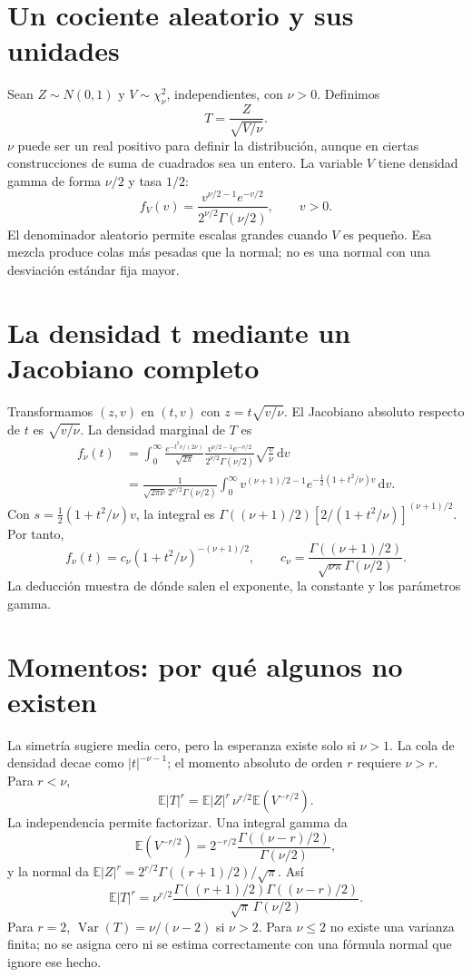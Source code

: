 \documentclass[11pt,a4paper]{article}
\newcommand{\E}{\mathbb E}
\newcommand{\dd}{\,\mathrm d}
\DeclareMathOperator{\Var}{Var}
\theoremstyle{definition}
\begin{document}
\section{Un cociente aleatorio y sus unidades}
Sean $Z\sim N(0,1)$ y $V\sim\chi_\nu^2$, independientes, con $\nu>0$.
Definimos
\[
T=\frac{Z}{\sqrt{V/\nu}}.
\]
$\nu$ puede ser un real positivo para definir la distribución, aunque en ciertas construcciones de suma de cuadrados sea un entero.
La variable $V$ tiene densidad gamma de forma $\nu/2$ y tasa $1/2$:
\[
f_V(v)=\frac{v^{\nu/2-1}e^{-v/2}}{2^{\nu/2}\Gamma(\nu/2)},\qquad v>0.
\]
El denominador aleatorio permite escalas grandes cuando $V$ es pequeño.
Esa mezcla produce colas más pesadas que la normal; no es una normal con una desviación estándar fija mayor.

\section{La densidad t mediante un Jacobiano completo}
Transformamos $(z,v)$ en $(t,v)$ con $z=t\sqrt{v/\nu}$.
El Jacobiano absoluto respecto de $t$ es $\sqrt{v/\nu}$.
La densidad marginal de $T$ es
\[
\begin{aligned}
f_\nu(t)
&=\int_0^\infty
\frac{e^{-t^2v/(2\nu)}}{\sqrt{2\pi}}
\frac{v^{\nu/2-1}e^{-v/2}}{2^{\nu/2}\Gamma(\nu/2)}
\sqrt{\frac v\nu}\dd v\\
&=\frac1{\sqrt{2\pi\nu}\,2^{\nu/2}\Gamma(\nu/2)}
\int_0^\infty v^{(\nu+1)/2-1}
e^{-\frac12(1+t^2/\nu)v}\dd v.
\end{aligned}
\]
Con $s=\tfrac12(1+t^2/\nu)v$, la integral es
$\Gamma((\nu+1)/2)[2/(1+t^2/\nu)]^{(\nu+1)/2}$.
Por tanto,
\[
f_\nu(t)=c_\nu(1+t^2/\nu)^{-(\nu+1)/2},\qquad
c_\nu=\frac{\Gamma((\nu+1)/2)}{\sqrt{\nu\pi}\Gamma(\nu/2)}.
\]
La deducción muestra de dónde salen el exponente, la constante y los parámetros gamma.

\section{Momentos: por qué algunos no existen}
La simetría sugiere media cero, pero la esperanza existe solo si $\nu>1$.
La cola de densidad decae como $|t|^{-\nu-1}$; el momento absoluto de orden $r$ requiere $\nu>r$.
Para $r<\nu$,
\[
\E|T|^r=\E|Z|^r\,\nu^{r/2}\E(V^{-r/2}).
\]
La independencia permite factorizar.
Una integral gamma da
\[
\E(V^{-r/2})=2^{-r/2}
\frac{\Gamma((\nu-r)/2)}{\Gamma(\nu/2)},
\]
y la normal da
$\E|Z|^r=2^{r/2}\Gamma((r+1)/2)/\sqrt\pi$.
Así
\[
\E|T|^r=
\nu^{r/2}\frac{\Gamma((r+1)/2)\Gamma((\nu-r)/2)}
{\sqrt\pi\,\Gamma(\nu/2)}.
\]
Para $r=2$, $\Var(T)=\nu/(\nu-2)$ si $\nu>2$.
Para $\nu\le2$ no existe una varianza finita; no se asigna cero ni se estima correctamente con una fórmula normal que ignore ese hecho.
\end{document}
